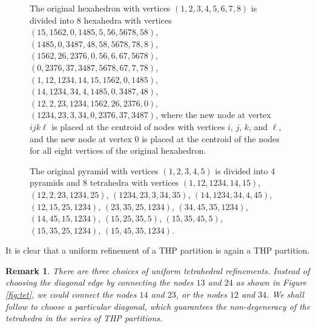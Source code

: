 \documentclass[twoside,reqno,final]{amsart}
\newtheorem{remark}{Remark}
\begin{document}

\begin{figure}[!ht]
\centerline{
}
\caption{
 The original hexahedron with vertices $(1,2,3,4,5,6,7,8)$ is divided into
8 hexahedra with vertices
$(15,1562,0,1485,5,56,5678,58)$, $(1485,0,3487,48,58,5678,78,8)$,
$(1562,26,2376,0,56,6,67,5678)$, $(0,2376,37,3487,5678,67,7,78)$,
$(1,12,1234,14,15,1562,0,1485)$, $(14,1234,34,4,1485,0,3487,48)$,
$(12,2,23,1234,1562,26,2376,0)$, $(1234,23,3,34, 0,2376,37,3487)$,
where 
the new node at vertex $ijk\ell$ is placed at the centroid of nodes with 
 vertices $i$, $j$, $k$, and $\ell$,
and the new node at vertex $0$ is placed at the centroid of the nodes for all eight vertices of the original hexahedron.
}
\label{fig:hex}
\end{figure}

\begin{figure}[!ht]
\centerline{
}
\caption{
The original pyramid with vertices $(1,2,3,4,5)$ is divided into
4 pyramids and 8 tetrahedra with vertices
$(1,12,1234,14,15)$, $(12,2,23,1234,25)$, 
$(1234,23,3,34,35)$, $(14,1234,34,4,45)$,
$ (12,15,25,1234)$, $(23,35,25,1234)$, $(34,45,35,1234)$, $(14,45,15,1234)$,
$(15,25,35, 5)$, $(15,35,45,5)$, $(15,35,25,1234)$, $(15,45,35,1234)$.
}
\label{fig:pyr}
\end{figure}

It is clear that a uniform refinement of a {\sf THP} partition is again a {\sf THP} partition.
\begin{remark}
There are three choices of uniform tetrahedral refinements. 
Instead of choosing the diagonal edge by connecting the nodes $13$ and $24$ as shown in 
 Figure \ref{fig:tet}, we could connect the nodes 
 $14$ and ${23}$, or the nodes $12$ and $34$.
 We shall follow \cite[Page 1138]{Ong94} to choose a particular diagonal, which guarantees 
the non-degeneracy of the tetrahedra in the series of {\sf THP} partitions.
\end{remark}
\end{document}
